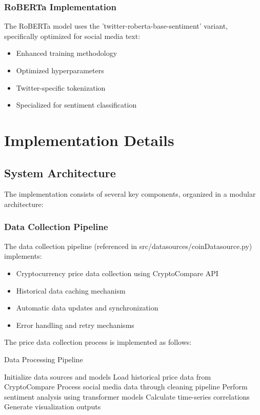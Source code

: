 \documentclass[12pt,a4paper]{report}
\begin{document}
\subsection{RoBERTa Implementation}
The RoBERTa model uses the 'twitter-roberta-base-sentiment' variant,
specifically optimized for social media text:

\begin{itemize}
    \item Enhanced training methodology
    \item Optimized hyperparameters
    \item Twitter-specific tokenization
    \item Specialized for sentiment classification
\end{itemize}

\chapter{Implementation Details}
\section{System Architecture}
The implementation consists of several key components, organized in a modular
architecture:

\subsection{Data Collection Pipeline}
The data collection pipeline (referenced in src/datasources/coinDatasource.py)
implements:

\begin{itemize}
    \item Cryptocurrency price data collection using CryptoCompare API
    \item Historical data caching mechanism
    \item Automatic data updates and synchronization
    \item Error handling and retry mechanisms
\end{itemize}

The price data collection process is implemented as follows:

\begin{algorithm}
    \caption{Data Processing Pipeline}
    \begin{algorithmic}[1]
        \State Initialize data sources and models
        \State Load historical price data from CryptoCompare
        \State Process social media data through cleaning pipeline
        \State Perform sentiment analysis using transformer models
        \State Calculate time-series correlations
        \State Generate visualization outputs
    \end{algorithmic}
\end{algorithm}
\end{document}
